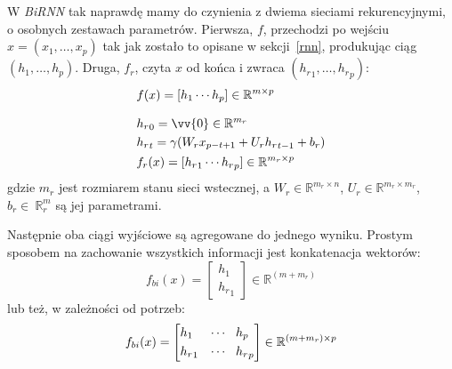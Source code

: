 W \textit{BiRNN} tak naprawdę mamy do czynienia z dwiema sieciami rekurencyjnymi, o osobnych zestawach parametrów. Pierwsza, $f$, przechodzi po wejściu $x = (x_1, \dots, x_p)$ tak jak zostało to opisane w sekcji~\ref{rnn}, produkując ciąg $(h_1, \dots, h_p)$. Druga, $f_r$, czyta $x$ od końca i zwraca $({h_r}_1, \dots, {h_r}_p)$:
\[
\begin{aligned}
    & f(x) = [h_1 \dotsb h_p] \in \mathbb{R}^{m \times p} \\[8pt]
    & {h_r}_0 = \vv{0} \in \mathbb{R}^{m_r} \\
    & {h_r}_t = \gamma(W_{r} x_{p-t+1} + U_r {h_r}_{t-1} + b_r) \\
    & f_r(x) = [{h_r}_1 \dotsb {h_r}_p] \in \mathbb{R}^{m_r \times p}
\end{aligned}
\]
gdzie $m_r$ jest rozmiarem stanu sieci wstecznej, a $W_r \in \mathbb{R}^{m_r \times n}$, $U_r \in \mathbb{R}^{m_r \times m_r}$, $b_r \in~\mathbb{R}^m_r$ są jej parametrami.

Następnie oba ciągi wyjściowe są agregowane do jednego wyniku. Prostym sposobem na zachowanie wszystkich informacji jest konkatenacja wektorów:
\[f_{bi}(x) =
\begin{bmatrix}
    h_1\\
    {h_r}_1
\end{bmatrix} \in \mathbb{R}^{(m + m_r)}
\]
lub też, w zależności od potrzeb:
\[f_{bi}(x) =
\begin{bmatrix}
    \begin{aligned}
        &h_1 &\dotsb \hspace{.3cm} &h_p\\
        &{h_r}_1 &\dotsb \hspace{.3cm} &{h_r}_p
    \end{aligned}
\end{bmatrix} \in \mathbb{R}^{(m + m_r) \times p}
\]
